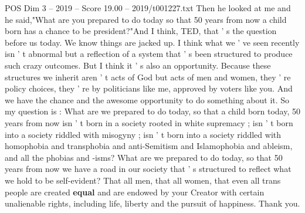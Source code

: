 \begin{textsample}{POS Dim 3 – 2019 – Score 19.00 – 2019/t001227.txt}
Then he looked at me and he said,"What are you prepared to do today so that 50 years from now a child born has a chance to be president?"And I think, TED, that ' s the question before us today.
We know things are jacked up.
I think what we ' ve seen recently isn ' t abnormal but a reflection of a system that ' s been structured to produce such crazy outcomes.
But I think it ' s also an opportunity.
Because these structures we inherit aren ' t acts of God but acts of men and women, they ' re policy choices, they ' re by politicians like me, approved by voters like you.
And we have the chance and the awesome opportunity to do something about it.
So my question is : What are we prepared to do today, so that a child born today, 50 years from now isn ' t born in a society rooted in white supremacy ; isn ' t born into a society riddled with misogyny ; isn ' t born into a society riddled with homophobia and transphobia and anti-Semitism and Islamophobia and ableism, and all the phobias and -isms?
What are we prepared to do today, so that 50 years from now we have a road in our society that ' s structured to reflect what we hold to be self-evident?
That all men, that all women, that even all trans people are created \textbf{equal} and are endowed by your Creator with certain unalienable rights, including life, liberty and the pursuit of happiness.
Thank you.

\end{textsample}
